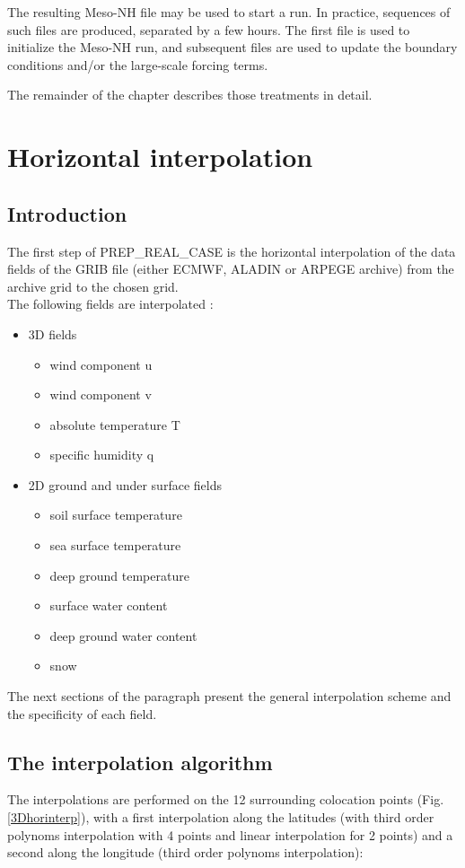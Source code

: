 The resulting Meso-NH file may be used to start a run. In practice,
sequences of such files are produced, separated by a few hours. The first
file is used to initialize the Meso-NH run, and subsequent files are
used to update the boundary conditions and/or the large-scale forcing
terms.

The remainder of the chapter describes those treatments in detail.

\section{Horizontal interpolation}

\subsection{Introduction}

The first step of PREP\_REAL\_CASE is the horizontal interpolation of the data fields
of the GRIB file (either ECMWF, ALADIN or ARPEGE archive) from the archive grid to the
chosen grid.\\

The following fields are interpolated :
\begin{itemize}
\item 3D fields
\begin{itemize}
\item wind component u
\item wind component v
\item absolute temperature T
\item specific humidity q
\end{itemize}
\item 2D ground and under surface fields
\begin{itemize}
\item soil surface temperature
\item sea surface temperature
\item deep ground temperature
\item surface water content
\item deep ground water content
\item snow
\end{itemize}
\end{itemize}

The next sections of the paragraph present the general interpolation scheme
and the specificity of each field.

\subsection{The interpolation algorithm}
The interpolations are performed on the 12 surrounding colocation points
(Fig. \ref{3Dhorinterp}), with a first interpolation along the latitudes
(with third order polynoms interpolation with 4 points and linear interpolation
for 2 points) and a second along the longitude (third order polynoms
interpolation):

